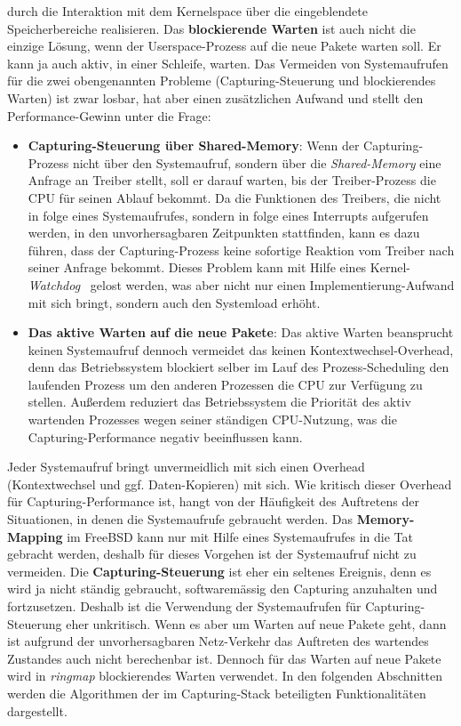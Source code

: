 durch die Interaktion mit dem Kernelspace über die eingeblendete
Speicherbereiche realisieren. Das \textbf{blockierende Warten} ist auch nicht
die einzige Lösung, wenn der Userspace-Prozess auf die neue Pakete warten soll.
Er kann ja auch aktiv, in einer Schleife, warten.  Das Vermeiden von
Systemaufrufen für die zwei obengenannten Probleme (Capturing-Steuerung und
blockierendes Warten) ist zwar losbar, hat aber einen zusätzlichen Aufwand und
stellt den Performance-Gewinn unter die Frage:
\begin{itemize}
	\item \textbf{Capturing-Steuerung über Shared-Memory}: Wenn der
		Capturing-Prozess nicht über den Systemaufruf, sondern über die
		\emph{Shared-Memory} eine Anfrage an Treiber stellt, soll er darauf
		warten, bis der Treiber-Prozess die CPU für seinen Ablauf bekommt.  Da
		die Funktionen des Treibers, die nicht in folge eines  Systemaufrufes,
		sondern in folge eines  Interrupts aufgerufen werden, in den
		unvorhersagbaren Zeitpunkten stattfinden, kann es dazu führen, dass der
		Capturing-Prozess keine sofortige Reaktion vom Treiber nach seiner
		Anfrage bekommt. Dieses Problem kann mit Hilfe eines
		Kernel-\emph{Watchdog}~\cite{wiki_watchdog} gelost werden, was aber
		nicht nur einen Implementierung-Aufwand mit sich bringt, sondern auch
		den Systemload erhöht.
	\item \textbf{Das aktive Warten auf die neue Pakete}: Das aktive Warten
		beansprucht keinen Systemaufruf dennoch vermeidet das keinen
		Kontextwechsel-Overhead, denn das Betriebssystem blockiert selber im
		Lauf des Prozess-Scheduling den laufenden Prozess um den anderen
		Prozessen die CPU zur Verfügung zu stellen. Außerdem reduziert das
		Betriebssystem die Priorität des aktiv wartenden Prozesses wegen seiner
		ständigen CPU-Nutzung, was die Capturing-Performance negativ
		beeinflussen kann.
\end{itemize}
Jeder Systemaufruf bringt unvermeidlich mit sich einen Overhead (Kontextwechsel
und ggf. Daten-Kopieren) mit sich. Wie kritisch dieser Overhead für
Capturing-Performance ist, hangt von der Häufigkeit des Auftretens der
Situationen, in denen die Systemaufrufe gebraucht werden.  Das
\textbf{Memory-Mapping} im FreeBSD kann nur mit Hilfe eines Systemaufrufes in
die Tat gebracht werden, deshalb für dieses Vorgehen ist der Systemaufruf nicht
zu vermeiden. Die \textbf{Capturing-Steuerung} ist eher ein seltenes Ereignis,
denn es wird ja nicht ständig gebraucht, softwaremässig den Capturing
anzuhalten und fortzusetzen.  Deshalb ist die Verwendung der Systemaufrufen für
Capturing-Steuerung eher unkritisch. Wenn es aber um Warten auf neue Pakete
geht, dann ist aufgrund der unvorhersagbaren Netz-Verkehr das Auftreten des
wartendes Zustandes auch nicht berechenbar ist. Dennoch für das Warten auf neue 
Pakete wird in \emph{ringmap} blockierendes Warten verwendet.
%
In den folgenden Abschnitten werden die Algorithmen der im Capturing-Stack 
beteiligten Funktionalitäten dargestellt.


